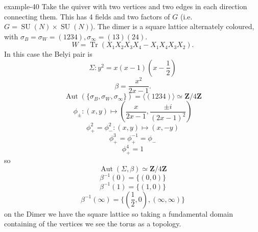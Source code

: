\documentclass[10pt,]{book}
\numberwithin{equation}{section}
\newcommand{\inv}{^{-1}}
\newcommand{\ZZ}{\mathbf{Z}}
\DeclareMathOperator{\trace}{Tr}
\DeclareMathOperator{\Aut}{Aut}
\DeclareMathOperator{\specialunitary}{SU}
\begin{document}
\begin{example}{}{example-40}%
\hypertarget{p-780}{}%
Take the quiver with two vertices and two edges in each direction connecting them. This has 4 fields and two factors of \(G\) (i.e. \(G = \specialunitary (N) \times \specialunitary (N)\)). The dimer is a square lattice alternately coloured, with \(\sigma_B = \sigma_W = (1234), \sigma_\infty = (13)(24)\).%
\begin{equation*}
W = \trace (X_1X_2X_3X_4 - X_1 X_4 X_3 X_2)\text{.}
\end{equation*}
In this case the Belyi pair is%
\begin{equation*}
\Sigma \colon y^2= x(x-1)(x-\frac12)
\end{equation*}
%
\begin{equation*}
\beta = \frac{x^2}{2x-1}\text{.}
\end{equation*}
%
\begin{equation*}
\Aut(\{\sigma_B,\sigma_W, \sigma_\infty\}) = \langle (1234) \rangle \simeq \ZZ/4\ZZ
\end{equation*}
%
\begin{equation*}
\phi_\pm \colon (x,y) \mapsto \left(\frac{x}{2x -1},\frac{\pm i}{(2x-1)^2} \right)
\end{equation*}
%
\begin{equation*}
\phi_+^2 = \phi_-^2 \colon (x,y) \mapsto (x,-y)
\end{equation*}
%
\begin{equation*}
\phi_+^3 = \phi_+\inv = \phi_-
\end{equation*}
%
\begin{equation*}
\phi_+^4 = 1
\end{equation*}
so%
\begin{equation*}
\Aut(\Sigma, \beta) \simeq \ZZ/4\ZZ
\end{equation*}
%
\begin{equation*}
\beta\inv(0)= \{(0,0)\}
\end{equation*}
%
\begin{equation*}
\beta\inv(1)= \{(1,0)\}
\end{equation*}
%
\begin{equation*}
\beta\inv(\infty)= \{(\frac 12,0), (\infty,\infty)\}
\end{equation*}
on the Dimer we have the square lattice so taking a fundamental domain containing  of the vertices we see the torus as a topology.%
\end{example}
\end{document}
